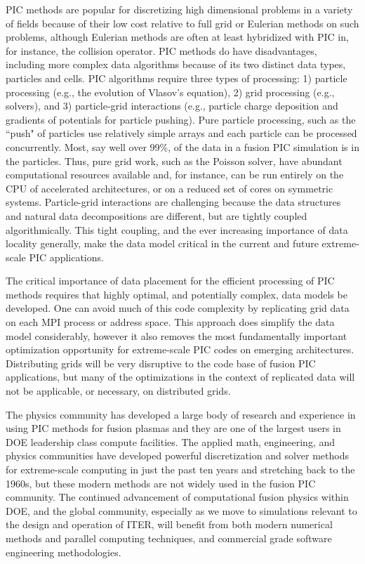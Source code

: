 \documentclass[review]{siamart}
\begin{document}
PIC methods are popular for discretizing high dimensional problems in a variety of fields because of their low cost relative to full grid or Eulerian methods on such problems, although Eulerian methods are often at least hybridized with PIC in, for instance, the collision operator.
PIC methods do have disadvantages, including more complex data algorithms because of its two distinct data types, particles and cells.
PIC algorithms require three types of processing: 1) particle processing (e.g., the evolution of Vlasov's equation), 2) grid processing (e.g., solvers), and 3) particle-grid interactions (e.g., particle charge deposition and gradients of potentials for particle pushing).
Pure particle processing, such as the ``push" of particles use relatively simple arrays and each particle can be processed concurrently.
Most, say well over $99\%$, of the data in a fusion PIC simulation is in the particles.
Thus, pure grid work, such as the Poisson solver, have abundant computational resources available and, for instance, can be run entirely on the CPU of accelerated architectures, or on a reduced set of cores on symmetric systems.
Particle-grid interactions are challenging because the data structures and natural data decompositions are different, but are tightly coupled algorithmically.
This tight coupling, and the ever increasing importance of data locality generally, make the data model critical in the current and future extreme-scale PIC applications.

The critical importance of data placement for the efficient processing of PIC methods requires that highly optimal, and potentially complex, data models be developed.
One can avoid much of this code complexity by replicating grid data on each MPI process or address space.
This approach does simplify the data model considerably, however it also removes the most fundamentally important optimization opportunity for extreme-scale PIC codes on emerging architectures.
Distributing grids will be very disruptive to the code base of fusion PIC applications, but many of the optimizations in the context of replicated data will not be applicable, or necessary, on distributed grids.

The physics community has developed a large body of research and experience in using PIC methods for fusion plasmas and they are one of the largest users in DOE leadership class compute facilities.
The applied math, engineering, and physics communities have developed powerful discretization and solver methods for extreme-scale computing in just the past ten years and stretching back to the 1960s, but these modern methods are not widely used in the fusion PIC community.
The continued advancement of computational fusion physics within DOE, and the global community, especially as we move to simulations relevant to the design and operation of ITER, will benefit from both modern numerical methods and parallel computing techniques, and commercial grade software engineering methodologies.
\end{document}
